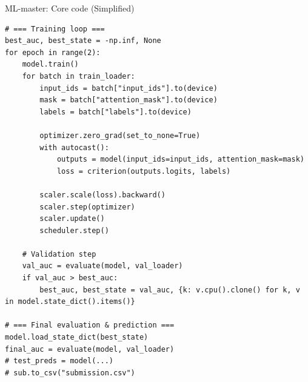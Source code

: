 \begin{codebox}{ML-master: Core code (Simplified)}
\begin{verbatim}
# === Training loop ===
best_auc, best_state = -np.inf, None
for epoch in range(2):
    model.train()
    for batch in train_loader:
        input_ids = batch["input_ids"].to(device)
        mask = batch["attention_mask"].to(device)
        labels = batch["labels"].to(device)

        optimizer.zero_grad(set_to_none=True)
        with autocast():
            outputs = model(input_ids=input_ids, attention_mask=mask)
            loss = criterion(outputs.logits, labels)

        scaler.scale(loss).backward()
        scaler.step(optimizer)
        scaler.update()
        scheduler.step()

    # Validation step
    val_auc = evaluate(model, val_loader)
    if val_auc > best_auc:
        best_auc, best_state = val_auc, {k: v.cpu().clone() for k, v in model.state_dict().items()}

# === Final evaluation & prediction ===
model.load_state_dict(best_state)
final_auc = evaluate(model, val_loader)
# test_preds = model(...)
# sub.to_csv("submission.csv")
\end{verbatim}
\end{codebox}